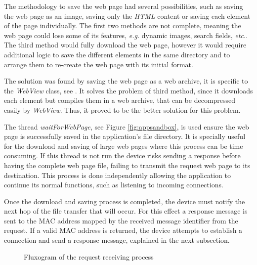 The methodology to save the web page had several possibilities, such as saving the web page as an image, saving only the \textit{HTML} content or saving each element of the page individually. The first two methods are not complete, meaning the web page could lose some of its features, \textit{e.g.} dynamic images, search fields, \textit{etc.}. The third method would fully download the web page, however it would require additional logic to save the different elements in the same directory and to arrange them to re-create the web page with its initial format.

The solution was found by saving the web page as a web archive, it is specific to the \textit{WebView} class, see \cite{webview}. It solves the problem of third method, since it downloads each element but compiles them in a web archive, that can be decompressed easily by \textit{WebView}. Thus, it proved to be the better solution for this problem.

The thread \textit{waitForWebPage}, see Figure \ref{fig:appsandbox}, is used ensure the web page is successfully saved in the application's file directory. It is specially useful for the download and saving of large web pages where this process can be time consuming. If this thread is not run the device risks sending a response before having the complete web page file, failing to transmit the request web page to its destination. This process is done independently allowing the application to continue its normal functions, such as listening to incoming connections.

Once the download and saving process is completed, the device must notify the next hop of the file transfer that will occur. For this effect a response message is sent to the \gls{MAC} address mapped by the received message identifier from the request. If a valid \gls{MAC} address is returned, the device attempts to establish a connection and send a response message, explained in the next subsection.

\begin{figure}[ht]
   \noindent{}
	\caption{\label{fig:rqtrcvflux} Fluxogram of the request receiving process}
\end{figure}

